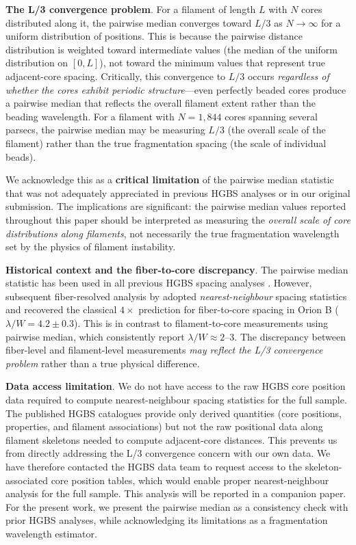 \documentclass[twocolumn,longtitle,usenatbib]{mnras}
\begin{document}
\textbf{The L/3 convergence problem}. For a filament of length $L$ with $N$ cores distributed along it, the pairwise median converges toward $L/3$ as $N \to \infty$ for a uniform distribution of positions. This is because the pairwise distance distribution is weighted toward intermediate values (the median of the uniform distribution on $[0, L]$), not toward the minimum values that represent true adjacent-core spacing. Critically, this convergence to $L/3$ occurs \textit{regardless of whether the cores exhibit periodic structure}—even perfectly beaded cores produce a pairwise median that reflects the overall filament extent rather than the beading wavelength. For a filament with $N = 1,844$ cores spanning several parsecs, the pairwise median may be measuring $L/3$ (the overall scale of the filament) rather than the true fragmentation spacing (the scale of individual beads).

We acknowledge this as a \textbf{critical limitation} of the pairwise median statistic that was not adequately appreciated in previous HGBS analyses or in our original submission. The implications are significant: the pairwise median values reported throughout this paper should be interpreted as measuring the \textit{overall scale of core distributions along filaments}, not necessarily the true fragmentation wavelength set by the physics of filament instability.

\textbf{Historical context and the fiber-to-core discrepancy}. The pairwise median statistic has been used in all previous HGBS spacing analyses \citep{Arzoumanian2011, Arzoumanian2019}. However, subsequent fiber-resolved analysis by \citet{Hacar2013, Hacar2018} adopted \textit{nearest-neighbour} spacing statistics and recovered the classical $4\times$ prediction for fiber-to-core spacing in Orion B ($\lambda/W = 4.2 \pm 0.3$). This is in contrast to filament-to-core measurements using pairwise median, which consistently report $\lambda/W \approx 2$--$3$. The discrepancy between fiber-level and filament-level measurements \textit{may reflect the L/3 convergence problem} rather than a true physical difference.

\textbf{Data access limitation}. We do not have access to the raw HGBS core position data required to compute nearest-neighbour spacing statistics for the full sample. The published HGBS catalogues provide only derived quantities (core positions, properties, and filament associations) but not the raw positional data along filament skeletons needed to compute adjacent-core distances. This prevents us from directly addressing the L/3 convergence concern with our own data. We have therefore contacted the HGBS data team to request access to the skeleton-associated core position tables, which would enable proper nearest-neighbour analysis for the full sample. This analysis will be reported in a companion paper. For the present work, we present the pairwise median as a consistency check with prior HGBS analyses, while acknowledging its limitations as a fragmentation wavelength estimator.
\end{document}
